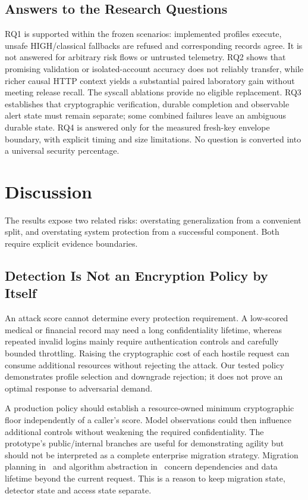 \documentclass[conference,a4paper]{IEEEtran}
\begin{document}
\subsection{Answers to the Research Questions}
RQ1 is supported within the frozen scenarios: implemented profiles execute, unsafe HIGH/classical fallbacks are refused and corresponding records agree. It is not answered for arbitrary risk flows or untrusted telemetry. RQ2 shows that promising validation or isolated-account accuracy does not reliably transfer, while richer causal HTTP context yields a substantial paired laboratory gain without meeting release recall. The syscall ablations provide no eligible replacement. RQ3 establishes that cryptographic verification, durable completion and observable alert state must remain separate; some combined failures leave an ambiguous durable state. RQ4 is answered only for the measured fresh-key envelope boundary, with explicit timing and size limitations. No question is converted into a universal security percentage.

\section{Discussion}
The results expose two related risks: overstating generalization from a convenient split, and overstating system protection from a successful component. Both require explicit evidence boundaries.

\subsection{Detection Is Not an Encryption Policy by Itself}
An attack score cannot determine every protection requirement. A low-scored medical or financial record may need a long confidentiality lifetime, whereas repeated invalid logins mainly require authentication controls and carefully bounded throttling. Raising the cryptographic cost of each hostile request can consume additional resources without rejecting the attack. Our tested policy demonstrates profile selection and downgrade rejection; it does not prove an optimal response to adversarial demand.

A production policy should establish a resource-owned minimum cryptographic floor independently of a caller's score. Model observations could then influence additional controls without weakening the required confidentiality. The prototype's public/internal branches are useful for demonstrating agility but should not be interpreted as a complete enterprise migration strategy. Migration planning in~\cite{readiness} and algorithm abstraction in~\cite{enterprise} concern dependencies and data lifetime beyond the current request. This is a reason to keep migration state, detector state and access state separate.
\end{document}
